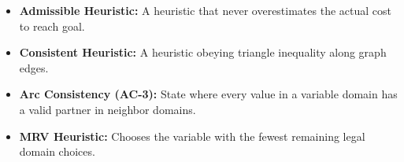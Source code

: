 \documentclass[12pt,a4paper]{article}
\begin{document}
\begin{tcolorbox}[defbox, title={\textbf{One-Line Definitions}}]
  \begin{itemize}[leftmargin=*, noitemsep]
    \item \textbf{Admissible Heuristic:} A heuristic that never overestimates the actual cost to reach goal.
    \item \textbf{Consistent Heuristic:} A heuristic obeying triangle inequality along graph edges.
    \item \textbf{Arc Consistency (AC-3):} State where every value in a variable domain has a valid partner in neighbor domains.
    \item \textbf{MRV Heuristic:} Chooses the variable with the fewest remaining legal domain choices.
  \end{itemize}
\end{tcolorbox}
\end{document}
